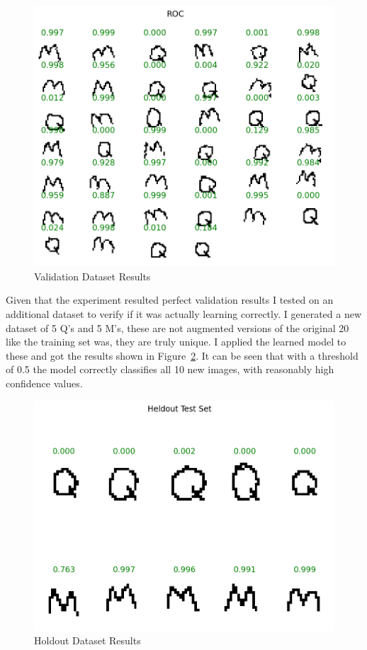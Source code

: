 \begin{figure}[htpb]
	\centering
	\includegraphics[width=\columnwidth]{figures/validation_results.png}
	\caption{Validation Dataset Results}
	\label{fig:val}
\end{figure}


Given that the experiment resulted perfect validation results I tested on an additional dataset to verify if it was actually learning correctly. I generated a new dataset of 5 Q's and 5 M's, these are not augmented versions of the original 20 like the training set was, they are truly unique. I applied the learned model to these and got the results shown in Figure~\ref{fig:holdout}. It can be seen that with a threshold of 0.5 the model correctly classifies all 10 new images, with reasonably high confidence values. 
\\
\begin{figure}[htpb]
	\centering
	\includegraphics[width=\columnwidth]{figures/holdout_results.png}
	\caption{Holdout Dataset Results}
	\label{fig:holdout}
\end{figure}



